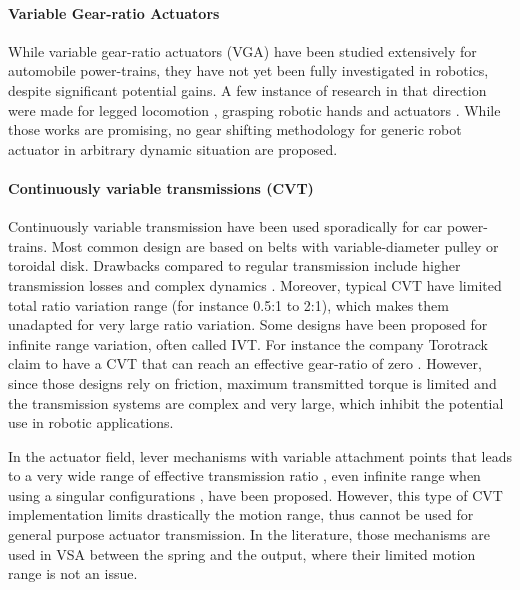 
\paragraph{Variable Gear-ratio Actuators} 
While variable gear-ratio actuators (VGA) have been studied extensively for automobile power-trains, they have not yet been fully investigated in robotics, despite significant potential gains. A few instance of research in that direction were made for legged locomotion \cite{hirose_design_1991}, grasping robotic hands \cite{shin_robot_2012} and actuators \cite{hirose_development_1999} \cite{byeong-sang_kim_improved_2007}\cite{tahara_high-backdrivable_2011}. While those works are promising, no gear shifting methodology for generic robot actuator in arbitrary dynamic situation are proposed.


\paragraph{Continuously variable transmissions (CVT)} 

Continuously variable transmission have been used sporadically for car power-trains. Most common design are based on belts with variable-diameter pulley or toroidal disk. Drawbacks compared to regular transmission include higher transmission losses and complex dynamics \cite{srivastava_review_2009}. Moreover, typical CVT have limited total ratio variation range (for instance 0.5:1 to 2:1), which makes them unadapted for very large ratio variation. Some designs have been proposed for infinite range variation, often called IVT. For instance the company Torotrack claim to have a CVT that can reach an effective gear-ratio of zero \cite{schoolcraft_gear_2011}. However, since those designs rely on friction, maximum transmitted torque is limited and the transmission systems are complex and very large, which inhibit the potential use in robotic applications. %

In the actuator field, lever mechanisms with variable attachment points that leads to a very wide range of effective transmission ratio \cite{tahara_high-backdrivable_2011}, even infinite range when using a singular configurations \cite{jafari_new_2014}, have been proposed. However, this type of CVT implementation limits drastically the motion range, thus cannot be used for general purpose actuator transmission. In the literature, those mechanisms are used in VSA between the spring and the output, where their limited motion range is not an issue. 


